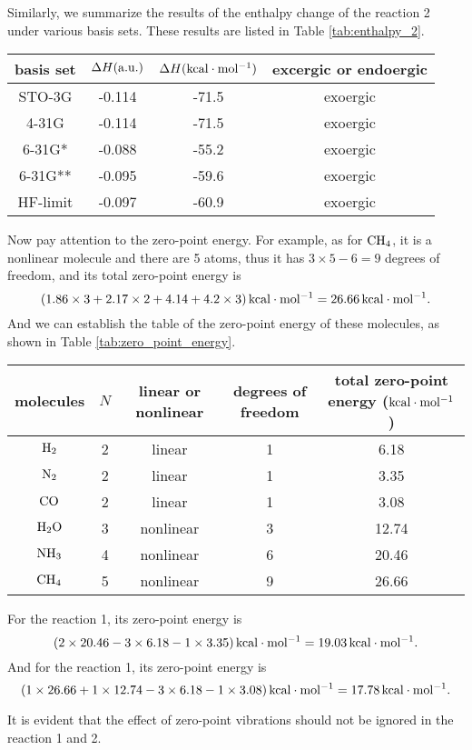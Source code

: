 \documentclass[a4paper]{book}
\newcounter{solution}[chapter]
\newcommand{\au}{{\rm a.u.}}
\newcommand\Tableref[1]{Table \ref{#1}}
\begin{document}
\begin{solution}
	Similarly, we summarize the results of the enthalpy change of the reaction 2 under various basis sets. These results are listed in \Tableref{tab:enthalpy_2}.
	\vspace{-1em}
	\begin{center}
	\label{tab:enthalpy_2}
	\begin{tabular}{c|c|c|c} \hline
	basis set & $\Delta H (\au)$ & $\Delta H ({\rm kcal\cdot mol^{-1}})$ & excergic or endoergic \\ \hline
	STO-3G 		& -0.114	& -71.5 & exoergic \\
	4-31G 		& -0.114 	& -71.5 & exoergic \\
	6-31G* 		& -0.088	& -55.2 & exoergic \\
	6-31G** 	& -0.095	& -59.6 & exoergic \\
	HF-limit 	& -0.097	& -60.9 & exoergic \\ \hline
	\end{tabular}
	\end{center}
	
	Now pay attention to the zero-point energy. For example, as for $\ce{CH4}$, it is a nonlinear molecule and there are 5 atoms, thus it has $3\times5-6=9$ degrees of freedom, and its total zero-point energy is
	\[
		( 1.86 \times 3 + 2.17 \times 2 + 4.14 + 4.2 \times 3 ) \, {\rm kcal \cdot mol^{-1}} = 26.66 \, {\rm kcal \cdot mol^{-1}}.
	\]
	And we can establish the table of the zero-point energy of these molecules, as shown in \Tableref{tab:zero_point_energy}.
	\vspace{-1em}
	\begin{center}
	\label{tab:zero_point_energy}
	\begin{tabular}{c|c|c|c|c}\hline
	molecules & $N$ & linear or nonlinear & degrees of freedom & total zero-point energy (${\rm kcal \cdot mol^{-1}}$) \\ \hline
	$\ce{H2}$ & 2 & linear & 1 & 6.18 \\
	$\ce{N2}$ & 2 & linear & 1 & 3.35 \\
	$\ce{CO}$ & 2 & linear & 1 & 3.08 \\
	$\ce{H2O}$ & 3 & nonlinear & 3 & 12.74 \\
	$\ce{NH3}$ & 4 & nonlinear & 6 & 20.46 \\
	$\ce{CH4}$ & 5 & nonlinear & 9 & 26.66 \\ \hline
	\end{tabular}
	\end{center}
	
	For the reaction 1, its zero-point energy is
	\[
		( 2 \times 20.46 - 3 \times 6.18 - 1 \times 3.35 ) \, {\rm kcal \cdot mol^{-1}} = 19.03 \, {\rm kcal \cdot mol^{-1}} .
	\]
	And for the reaction 1, its zero-point energy is
	\[
		( 1 \times 26.66 + 1 \times 12.74 - 3 \times 6.18 - 1 \times 3.08 ) \, {\rm kcal \cdot mol^{-1}} = 17.78 \, {\rm kcal \cdot mol^{-1}} .
	\]
	
	It is evident that the effect of zero-point vibrations should not be ignored in the reaction 1 and 2.
	
	\end{solution}
	
\end{document}
